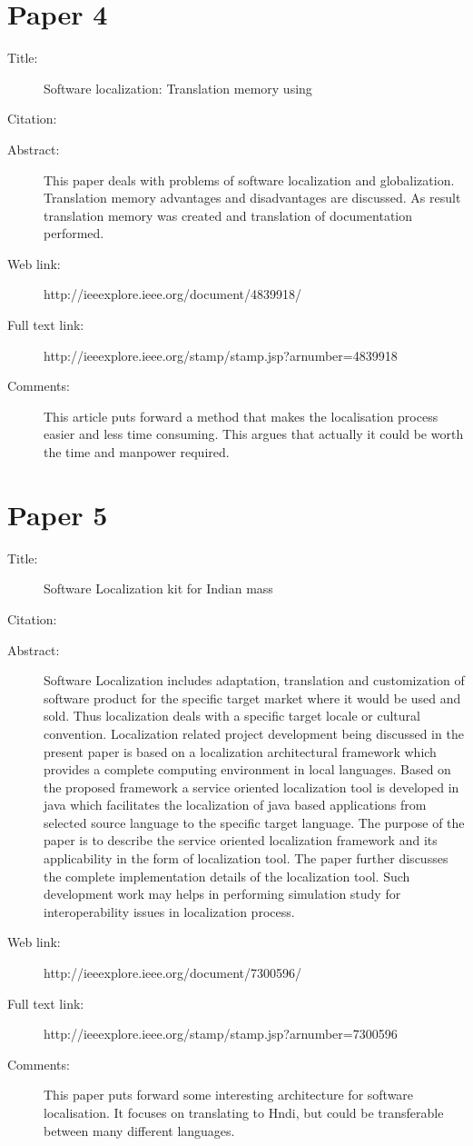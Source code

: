 \documentclass{scrartcl}
\begin{document}
\section*{Paper 4}
\begin{description}
\item[Title:] Software localization: Translation memory using
\item[Citation:] \cite{sviridova2009software}
\item[Abstract:] This paper deals with problems of software localization and globalization. Translation memory advantages and disadvantages are discussed. As result translation memory was created and translation of documentation performed.
\item[Web link:]http://ieeexplore.ieee.org/document/4839918/
\item[Full text link:] http://ieeexplore.ieee.org/stamp/stamp.jsp?arnumber=4839918
\item[Comments:]This article puts forward a method that makes the localisation process easier and less time consuming. This argues that actually it could be worth the time and manpower required.
\end{description}

\section*{Paper 5}
\begin{description}
\item[Title:] Software Localization kit for Indian mass
\item[Citation:] \cite{tomar2014software}
\item[Abstract:]Software Localization includes adaptation, translation and customization of software product for the specific target market where it would be used and sold. Thus localization deals with a specific target locale or cultural convention. Localization related project development being discussed in the present paper is based on a localization architectural framework which provides a complete computing environment in local languages. Based on the proposed framework a service oriented localization tool is developed in java which facilitates the localization of java based applications from selected source language to the specific target language. The purpose of the paper is to describe the service oriented localization framework and its applicability in the form of localization tool. The paper further discusses the complete implementation details of the localization tool. Such development work may helps in performing simulation study for interoperability issues in localization process.
\item[Web link:] http://ieeexplore.ieee.org/document/7300596/
\item[Full text link:] http://ieeexplore.ieee.org/stamp/stamp.jsp?arnumber=7300596
\item[Comments:] This paper puts forward some interesting architecture for software localisation. It focuses on translating to Hndi, but could be transferable between many different languages.
\end{description}



\end{document}
